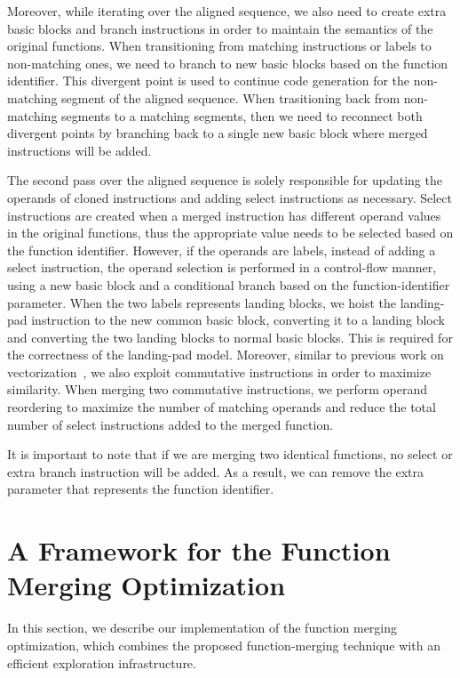 Moreover, while iterating over the aligned sequence, we also need
to create extra basic blocks and branch instructions in order to maintain the
semantics of the original functions.
When transitioning from matching instructions or labels to non-matching ones,
we need to branch to new basic blocks based on the function identifier.
This divergent point is used to continue code generation for the non-matching
segment of the aligned sequence.
When trasitioning back from non-matching segments to a matching segments, then
we need to reconnect both divergent points by branching back to a single new
basic block where merged instructions will be added.

The second pass over the aligned sequence is solely responsible for updating
the operands of cloned instructions and adding select instructions as necessary.
Select instructions are created when a merged instruction has different operand 
values in the original functions, thus the appropriate value needs to be
selected based on the function identifier.
However, if the operands are labels, instead of adding a select instruction,
the operand selection is performed in a control-flow manner, using a new basic
block and a conditional branch based on the function-identifier parameter.
When the two labels represents landing blocks, we hoist the landing-pad
instruction to the new common basic block, converting it to a landing block and
converting the two landing blocks to normal basic blocks.
This is required for the correctness of the landing-pad model.
Moreover, similar to previous work on vectorization~\cite{porpodas18}, we also
exploit commutative instructions in order to maximize similarity.
When merging two commutative instructions, we perform operand reordering to
maximize the number of matching operands and reduce the total number of select
instructions added to the merged function.

It is important to note that if we are merging two identical functions, no
select or extra branch instruction will be added.
As a result, we can remove the extra parameter that represents the function
identifier.

\section{A Framework for the Function Merging Optimization}
\label{sec:framework}

In this section, we describe our implementation of the function merging
optimization, which combines the proposed function-merging technique with an
efficient exploration infrastructure.


